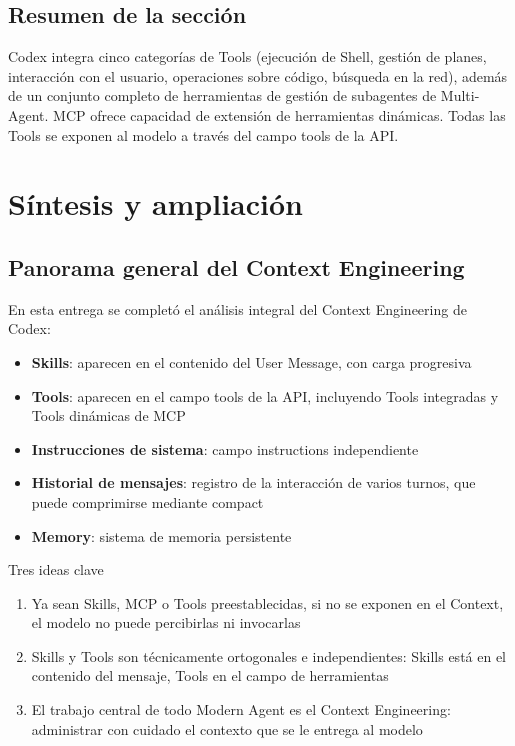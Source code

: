\documentclass[a4paper]{article}
\begin{document}
\subsection{Resumen de la sección}

Codex integra cinco categorías de Tools (ejecución de Shell, gestión de planes, interacción con el usuario, operaciones sobre código, búsqueda en la red), además de un conjunto completo de herramientas de gestión de subagentes de Multi-Agent. MCP ofrece capacidad de extensión de herramientas dinámicas. Todas las Tools se exponen al modelo a través del campo tools de la API.
\section{Síntesis y ampliación}

\subsection{Panorama general del Context Engineering}

En esta entrega se completó el análisis integral del Context Engineering de Codex:

\begin{itemize}
    \item \textbf{Skills}: aparecen en el contenido del User Message, con carga progresiva
    \item \textbf{Tools}: aparecen en el campo tools de la API, incluyendo Tools integradas y Tools dinámicas de MCP
    \item \textbf{Instrucciones de sistema}: campo instructions independiente
    \item \textbf{Historial de mensajes}: registro de la interacción de varios turnos, que puede comprimirse mediante compact
    \item \textbf{Memory}: sistema de memoria persistente
\end{itemize}

\begin{importantbox}{Tres ideas clave}
\begin{enumerate}
    \item Ya sean Skills, MCP o Tools preestablecidas, si no se exponen en el Context, el modelo no puede percibirlas ni invocarlas
    \item Skills y Tools son técnicamente ortogonales e independientes: Skills está en el contenido del mensaje, Tools en el campo de herramientas
    \item El trabajo central de todo Modern Agent es el Context Engineering: administrar con cuidado el contexto que se le entrega al modelo
\end{enumerate}
\end{importantbox}
\end{document}
